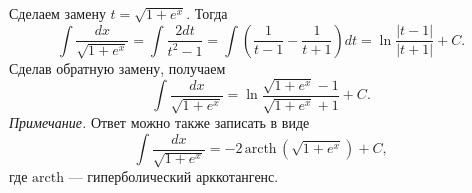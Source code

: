 \documentclass{article}
\begin{document}
Сделаем замену $t=\sqrt{1 + e^x}$. Тогда
$$\int \frac{dx}{\sqrt{1+e^x}} = \int \frac{2 dt}{t^2 - 1} = \int \left( \frac{1}{t-1} - \frac{1}{t+1} \right) dt = \ln \frac{|t-1|}{|t+1|} + C.$$
Сделав обратную замену, получаем
$$\int \frac{dx}{\sqrt{1+e^x}} = \ln \frac{\sqrt{1+e^x} - 1}{\sqrt{1+e^x} + 1} + C.$$
\textit{Примечание.} Ответ можно также записать в виде
$$\int \frac{dx}{\sqrt{1+e^x}} = -2\, \textrm{arcth}\, (\sqrt{1+e^x}) + C,$$
где $\textrm{arcth}$ --- гиперболический арккотангенс.
\end{document}
